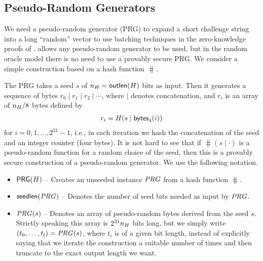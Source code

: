 \documentclass[11pt]{article}
\begin{document}
\subsection{Pseudo-Random Generators}\label{sect:prg}

We need a pseudo-random generator (PRG) to expand a short challenge
string into a long ``random'' vector to use batching techniques in the
zero-knowledge proofs of . \veri allows any
pseudo-random generator to be used, but in the random oracle model
there is no need to use a provably secure PRG. We consider a simple
construction based on a hash function $\hash$.

The PRG takes a seed $s$ of $n_{H}=\textsf{outlen}(H)$ bits
as input. Then it generates a sequence of bytes $r_0\mid r_1\mid
r_2\mid\cdots$, where $\mid$ denotes concatenation, and $r_i$ is an
array of $n_{H}/8$ bytes defined by
\begin{align*}
  r_i=H(s\mid\textsf{bytes}_{4}(i))
\end{align*}
for $i=0,1,\ldots,2^{31}-1$, i.e., in each iteration we hash the
concatenation of the seed and an integer counter (four bytes). It is
not hard to see that if $\hash(s\mid\cdot)$ is a pseudo-random
function for a random choice of the seed, then this is a provably
secure construction of a pseudo-random generator. We use the following
notation.
\begin{itemize}



\item$\textsf{PRG}(H)$ -- Creates an unseeded instance $\mathit{PRG}$ from a hash
  function $\hash$.

\item$\textsf{seedlen}(\mathit{PRG})$ -- Denotes the number of seed bits needed as
  input by $\mathit{PRG}$.

\item$\mathit{PRG}(s)$ -- Denotes an array of pseudo-random bytes derived from
  the seed $s$. Strictly speaking this array is
  $2^{31}n_{H}$ bits long, but we simply write
  $(t_0,\ldots,t_l)=\mathit{PRG}(s)$, where $t_i$ is of a given bit length,
  instead of explicitly saying that we iterate the construction a
  suitable number of times and then truncate to the exact output
  length we want.

\end{itemize}
\end{document}
